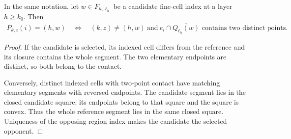 \begin{lemma}
    \label{thm:area_law_selected_opponent_contact}
    \leanok
    In the same notation,
    let $w\in F_{h,\ell_h}$ be a candidate fine-cell index
    at a layer $h\ge k_0$. Then
    \begin{align}
        P_{k,z}(i)=(h,w)
        \quad\Longleftrightarrow\quad
        (k,z)\ne(h,w)\ \text{and}\
        e_i\cap\overline{Q_{\ell_h}(w)}
        \text{ contains two distinct points}.
    \end{align}
\end{lemma}
\begin{proof}\leanok
    If the candidate is selected, its indexed cell differs from the
    reference and its closure contains the whole segment. The two
    elementary endpoints are distinct, so both belong to the contact.

    Conversely, distinct indexed cells with two-point contact have
    matching elementary segments with reversed endpoints.
    The candidate segment lies in the closed candidate square:
    its endpoints belong to that square and the square is convex.
    Thus the whole reference segment lies in the same closed square.
    Uniqueness of the opposing region index makes the candidate the
    selected opponent.
\end{proof}

